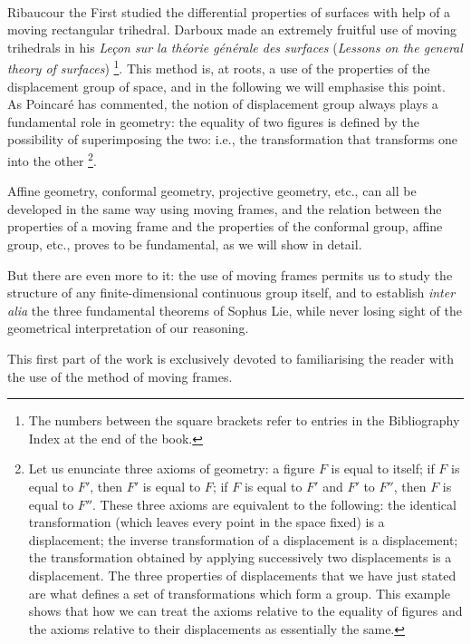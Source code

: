 \documentclass[leqno,11pt]{book}
\numberwithin{equation}{chapter}
\theoremstyle{shape1}
\theoremstyle{shapesmall}
\begin{document}
\paragraph{}\label{sec:1} Ribaucour the First studied the differential
properties of surfaces with help of a moving rectangular
trihedral. Darboux made an extremely fruitful use of moving trihedrals
in his \emph{Leçon sur la théorie générale des surfaces}
(\emph{Lessons on the general theory of surfaces})
\cite{1}\footnote{The numbers between the square brackets refer to
  entries in the Bibliography Index at the end of the book.}. This
method is, at roots, a use of the properties of the displacement group
of space, and in the following we will emphasise this point. As
Poincaré has commented, the notion of displacement group always plays
a fundamental role in geometry: the equality of two figures is defined
by the possibility of superimposing the two: i.e., the transformation
that transforms one into the other \footnote{Let us enunciate three
  axioms of geometry: a figure $F$ is equal to itself; if $F$ is equal
  to $F'$, then $F'$ is equal to $F$; if $F$ is equal to $F'$ and $F'$
  to $F''$, then $F$ is equal to $F''$. These three axioms are
  equivalent to the following: the identical transformation (which
  leaves every point in the space fixed) is a displacement; the
  inverse transformation of a displacement is a displacement; the
  transformation obtained by applying successively two displacements
  is a displacement. The three properties of displacements that we
  have just stated are what defines a set of transformations which
  form a group. This example shows that how we can treat the axioms
  relative to the equality of figures and the axioms relative to their
  displacements as essentially the same.}.

Affine geometry, conformal geometry, projective geometry, etc., can
all be developed in the same way using moving frames, and the relation
between the properties of a moving frame and the properties of the
conformal group, affine group, etc., proves to be fundamental, as we
will show in detail.

But there are even more to it: the use of moving frames permits us to
study the structure of any finite-dimensional continuous group itself,
and to establish \emph{inter alia} the three fundamental theorems of
Sophus Lie, while never losing sight of the geometrical interpretation
of our reasoning.

This first part of the work is exclusively devoted to familiarising
the reader with the use of the method of moving frames.
\end{document}

